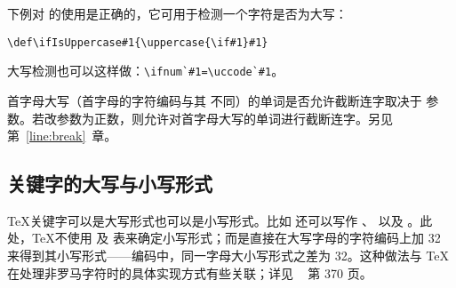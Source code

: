 \documentclass{book}
\begin{document}
下例对  的使用是正确的，它可用于检测一个字符是否为大写：
\begin{verbatim}
\def\ifIsUppercase#1{\uppercase{\if#1}#1}
\end{verbatim}
大写检测也可以这样做：\verb>\ifnum`#1=\uccode`#1>。

首字母大写（首字母的字符编码与其  不同）的单词是否允许截断连字取决于  参数。若改参数为正数，则允许对首字母大写的单词进行截断连字。另见第~\ref{line:break}~章。

\subsection{关键字的大写与小写形式}

\TeX 关键字可以是大写形式也可以是小写形式。比如  还可以写作 、 以及 。此处，\TeX 不使用  及  表来确定小写形式；而是直接在大写字母的字符编码上加 32 来得到其小写形式——\ascii 编码中，同一字母大小写形式之差为 32。这种做法与 \TeX 在处理非罗马字符时的具体实现方式有些关联；详见 \TeXbook\ \cite{Knuth:TeXbook} 第 370 页。

\end{document}
